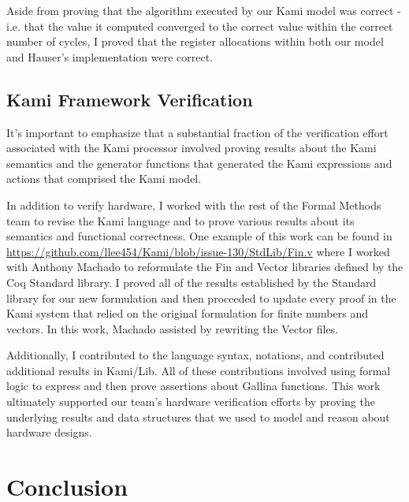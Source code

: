 \documentclass[10pt,a4paper]{article}
\begin{document}
Aside from proving that the algorithm executed by our Kami model was correct - i.e. that the value it computed converged to the correct value within the correct number of cycles, I proved that the register allocations within both our model and Hauser’s implementation were correct.

\subsection{Kami Framework Verification}

It’s important to emphasize that a substantial fraction of the verification effort associated with the Kami processor involved proving results about the Kami semantics and the generator functions that generated the Kami expressions and actions that comprised the Kami model. 

In addition to verify hardware, I worked with the rest of the Formal Methods team to revise the Kami language and to prove various results about its semantics and functional correctness. One example of this work can be found in \url{https://github.com/llee454/Kami/blob/issue-130/StdLib/Fin.v} where I worked with Anthony Machado to reformulate the Fin and Vector libraries defined by the Coq Standard library. I proved all of the results established by the Standard library for our new formulation and then proceeded to update every proof in the Kami system that relied on the original formulation for finite numbers and vectors. In this work, Machado assisted by rewriting the Vector files.

Additionally, I contributed to the language syntax, notations, and contributed additional results in Kami/Lib. All of these contributions involved using formal logic to express and then prove assertions about Gallina functions. This work ultimately supported our team’s hardware verification efforts by proving the underlying results and data structures that we used to model and reason about hardware designs.

\section{Conclusion}
\end{document}
